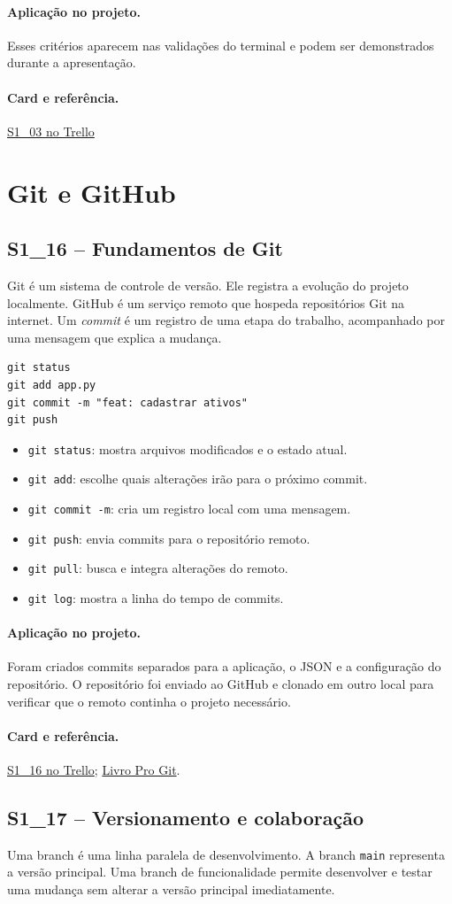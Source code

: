 \documentclass[11pt,a4paper]{article}
\newcommand{\projeto}{\paragraph{Aplicação no projeto.}}
\newcommand{\referencia}[2]{\paragraph{Card e referência.}\href{#1}{#2}}
\newcommand{\cardsection}[1]{\Needspace{12\baselineskip}\subsection{#1}}
\begin{document}
\projeto
Esses critérios aparecem nas validações do terminal e podem ser demonstrados durante a apresentação.

\referencia{https://trello.com/c/MRXQneEZ}{S1\_03 no Trello}

\section{Git e GitHub}

\cardsection{S1\_16 -- Fundamentos de Git}

Git é um sistema de controle de versão. Ele registra a evolução do projeto localmente. GitHub é um serviço remoto que hospeda repositórios Git na internet. Um \emph{commit} é um registro de uma etapa do trabalho, acompanhado por uma mensagem que explica a mudança.

\begin{lstlisting}[caption={Sequência básica de comandos Git}]
git status
git add app.py
git commit -m "feat: cadastrar ativos"
git push
\end{lstlisting}

\begin{itemize}
  \item \texttt{git status}: mostra arquivos modificados e o estado atual.
  \item \texttt{git add}: escolhe quais alterações irão para o próximo commit.
  \item \texttt{git commit -m}: cria um registro local com uma mensagem.
  \item \texttt{git push}: envia commits para o repositório remoto.
  \item \texttt{git pull}: busca e integra alterações do remoto.
  \item \texttt{git log}: mostra a linha do tempo de commits.
\end{itemize}

\projeto
Foram criados commits separados para a aplicação, o JSON e a configuração do repositório. O repositório foi enviado ao GitHub e clonado em outro local para verificar que o remoto continha o projeto necessário.

\referencia{https://trello.com/c/vUu4H8Bq}{S1\_16 no Trello}; \href{https://git-scm.com/book/pt-br/v2}{Livro Pro Git}.

\cardsection{S1\_17 -- Versionamento e colaboração}

Uma branch é uma linha paralela de desenvolvimento. A branch \texttt{main} representa a versão principal. Uma branch de funcionalidade permite desenvolver e testar uma mudança sem alterar a versão principal imediatamente.
\end{document}
